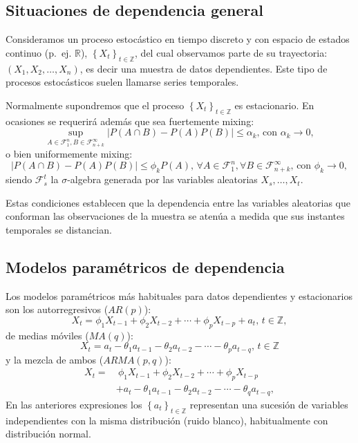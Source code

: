 \documentclass[]{book}
\theoremstyle{definition}
\theoremstyle{definition}
\theoremstyle{definition}
\theoremstyle{remark}
\begin{document}
\subsection{Situaciones de dependencia
general}\label{situaciones-de-dependencia-general}

Consideramos un proceso estocástico en tiempo discreto y con espacio de
estados continuo (p.~ej. \(\mathbb{R}\)),
\(\left\{X_{t}\right\}_{t\in \mathbb{Z}}\), del cual observamos parte de
su trayectoria: \(\left( X_1,X_2,\ldots ,X_n \right)\), es decir una
muestra de datos dependientes. Este tipo de procesos estocásticos suelen
llamarse series temporales.

Normalmente supondremos que el proceso
\(\left\{ X_{t}\right\}_{t\in \mathbb{Z}}\) es estacionario. En
ocasiones se requerirá además que sea fuertemente mixing:
\[\sup_{A\in \mathcal{F}_1^{n},B\in \mathcal{F}_{n+k}^{\infty }}\left\vert
P\left( A\cap B \right) -P\left( A \right) P(B) \right\vert \leq
\alpha _{k}\text{, con }\alpha _{k}\rightarrow 0,\] o bien uniformemente
mixing:
\[\left\vert P\left( A\cap B \right) -P\left( A \right) P(B) \right\vert 
\leq \phi _{k}P\left( A \right) \text{, }\forall A\in \mathcal{F}_1^{n},
\forall B\in \mathcal{F}_{n+k}^{\infty }\text{, con }\phi_{k}\rightarrow 0,\]
siendo \(\mathcal{F}_{s}^{t}\) la \(\sigma\)-algebra generada por las
variables aleatorias \(X_{s},\ldots ,X_{t}\).

Estas condiciones establecen que la dependencia entre las variables
aleatorias que conforman las observaciones de la muestra se atenúa a
medida que sus instantes temporales se distancian.

\subsection{Modelos paramétricos de
dependencia}\label{modelos-parametricos-de-dependencia}

Los modelos paramétricos más habituales para datos dependientes y
estacionarios son los autorregresivos (\(AR\left( p \right)\)):
\[X_{t}=\phi _1X_{t-1}+\phi _2X_{t-2}+\cdots +\phi _{p}X_{t-p}+a_{t}
\text{, }t\in \mathbb{Z},\] de medias móviles (\(MA\left( q \right)\)):
\[X_{t}=a_{t}-\theta _1a_{t-1}-\theta _2a_{t-2}-\cdots -\theta _{p}a_{t-q}
\text{, }t\in \mathbb{Z}\] y la mezcla de ambos
(\(ARMA\left( p,q \right)\)): \[\begin{aligned}
X_{t} =&\ \phi _1X_{t-1}+\phi _2X_{t-2}+\cdots +\phi _{p}X_{t-p} \\
&+a_{t}-\theta _1a_{t-1}-\theta _2a_{t-2}-\cdots -\theta _{q}a_{t-q},\end{aligned}\]
En las anteriores expresiones los
\(\left\{ a_{t}\right\} _{t\in \mathbb{Z}}\) representan una sucesión de
variables independientes con la misma distribución (ruido blanco),
habitualmente con distribución normal.
\end{document}
